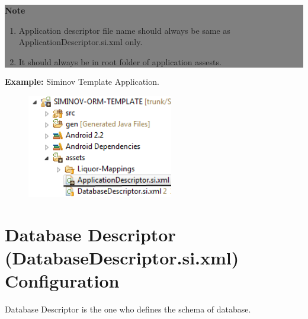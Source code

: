 \begin{center}
	\colorbox{grey}{
		\parbox[t]{.8\linewidth}{
			\fontsize{11pt}{11pt}\selectfont %
			\vspace*{0.1cm} %
		
			\hfill \textbf{Note} \\

			\hfill 	
			\begin{enumerate}
			
				\item \small Application descriptor file name should always be same as ApplicationDescriptor.si.xml only.

				\item \small It should always be in root folder of application assests.

			\end{enumerate}

			\vspace*{0.0cm} %
		}
}

\end{center}

	\par
		\textbf{Example:} Siminov Template Application.
		\begin{figure}[htbp]
			\centering
				\includegraphics[height=4.5cm]{Resources/siminov_application_template_application_descriptor_path_example.png}
		\end{figure}


\newpage
\section{Database Descriptor (DatabaseDescriptor.si.xml) Configuration}
	Database Descriptor is the one who defines the schema of database.
	
